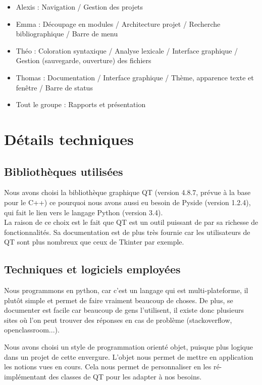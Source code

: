 \documentclass[a4paper,12pt]{article}
\begin{document}
	\begin{itemize}
		\item Alexis : Navigation / Gestion des projets
		\item Emma : Découpage en modules / Architecture projet / Recherche bibliographique / Barre de menu
		\item Théo : Coloration syntaxique / Analyse lexicale / Interface graphique / Gestion (sauvegarde, ouverture) des fichiers
		\item Thomas : Documentation / Interface graphique / Thème, apparence texte et fenêtre / Barre de status
		\item Tout le groupe : Rapports et présentation 
	\end{itemize}
	
\section{Détails techniques}

	\subsection{Bibliothèques utilisées}
	
	Nous avons choisi la bibliothèque graphique QT (version 4.8.7, prévue à la base pour le C++) ce pourquoi nous avons aussi eu besoin de Pyside (version 1.2.4), qui fait le lien vers le langage Python (version 3.4).\\
	
	La raison de ce choix est le fait que QT est un outil puissant de par sa richesse de fonctionnalités. Sa documentation est de plus très fournie car les utilisateurs de QT sont plus nombreux que ceux de Tkinter par exemple.
	
	\subsection{Techniques et logiciels employées}
	
	Nous programmons en python, car c'est un langage qui est multi-plateforme, il plutôt simple et permet de faire vraiment beaucoup de choses. De plus, se documenter est facile car beaucoup de gens l'utilisent, il existe donc plusieurs sites où l'on peut trouver des réponses en cas de problème (stackoverflow, openclassroom...).
	
	Nous avons choisi un style de programmation orienté objet, puisque plus logique dans un projet de cette envergure. L'objet nous permet de mettre en application les notions vues en cours. Cela nous permet de personnaliser en les ré-implémentant des classes de QT pour les adapter à nos besoins.\\
	
\end{document}
